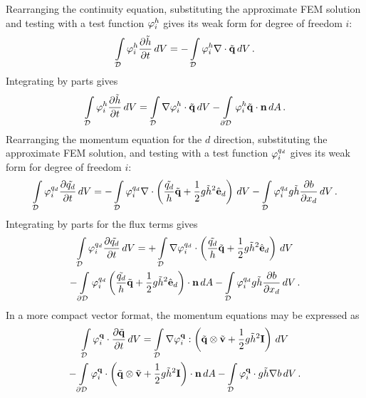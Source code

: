 Rearranging the continuity equation, substituting the approximate FEM
solution and testing with a test function $\varphi_i^h$ gives its
weak form for degree of freedom $i$:
\begin{equation}
  \int\limits_{\mathcal{D}} \varphi_i^h\frac{\partial \tilde{h}}{\partial t} \,dV
  = - \int\limits_{\mathcal{D}} \varphi_i^h\nabla\cdot\tilde{\mathbf{q}} \,dV
  \,.
\end{equation}
Integrating by parts gives
\begin{equation}\label{eq:shallowwater_height_weak_form}
  \int\limits_{\mathcal{D}} \varphi_i^h\frac{\partial \tilde{h}}{\partial t} \,dV
  = \int\limits_{\mathcal{D}} \nabla\varphi_i^h\cdot\tilde{\mathbf{q}} \,dV
  - \int\limits_{\partial\mathcal{D}} \varphi_i^h\tilde{\mathbf{q}}\cdot\mathbf{n} \,dA
  \,.
\end{equation}
Rearranging the momentum equation for the $d$ direction, substituting the
approximate FEM solution, and testing with a test function
$\varphi_i^{q_d}$ gives its weak form for degree of freedom
$i$:
\begin{equation}
  \int\limits_{\mathcal{D}} \varphi_i^{q_d}\frac{\partial \tilde{q_d}}{\partial t} \,dV
  =
  - \int\limits_{\mathcal{D}} \varphi_i^{q_d}
      \nabla\cdot\left(\frac{\tilde{q_d}}{h}
        \tilde{\mathbf{q}}
      + \frac{1}{2}g\tilde{h}^2\hat{\mathbf{e}}_d\right) \,dV
  - \int\limits_{\mathcal{D}} \varphi_i^{q_d}
      g\tilde{h}\frac{\partial b}{\partial x_d} \,dV
  \,.
\end{equation}
Integrating by parts for the flux terms gives
\begin{multline}\label{eq:shallowwater_momentumx_weak_form}
  \int\limits_{\mathcal{D}} \varphi_i^{q_d}\frac{\partial \tilde{q_d}}{\partial t} \,dV
  =
  + \int\limits_{\mathcal{D}} \nabla\varphi_i^{q_d}
      \cdot\left(\frac{\tilde{q_d}}{h}
        \tilde{\mathbf{q}}
      + \frac{1}{2}g\tilde{h}^2\hat{\mathbf{e}}_d\right) \,dV
  \\
  - \int\limits_{\partial\mathcal{D}} \varphi_i^{q_d}
      \left(\frac{\tilde{q_d}}{h}
        \tilde{\mathbf{q}}
      + \frac{1}{2}g\tilde{h}^2\hat{\mathbf{e}}_d\right)\cdot\mathbf{n} \,dA
  - \int\limits_{\mathcal{D}} \varphi_i^{q_d}
      g\tilde{h}\frac{\partial b}{\partial x_d} \,dV
  \,.
\end{multline}
In a more compact vector format, the momentum equations may be expressed as
\begin{multline}
  \int\limits_{\mathcal{D}} \varphi_i^{\mathbf{q}}\cdot\frac{\partial \tilde{\mathbf{q}}}{\partial t} \,dV
  = \int\limits_{\mathcal{D}} \nabla\varphi_i^{\mathbf{q}}:
    \left(\tilde{\mathbf{q}}\otimes\tilde{\mathbf{v}}
    + \frac{1}{2}g\tilde{h}^2\mathbf{I}\right) \,dV
  \\
  - \int\limits_{\partial\mathcal{D}} \varphi_i^{\mathbf{q}}\cdot
    \left(\tilde{\mathbf{q}}\otimes\tilde{\mathbf{v}}
    + \frac{1}{2}g \tilde{h}^2\mathbf{I}\right)\cdot\mathbf{n} \,dA
  - \int\limits_{\mathcal{D}} \varphi_i^{\mathbf{q}}\cdot
    g\tilde{h}\nabla b \,dV
  \,.
\end{multline}
